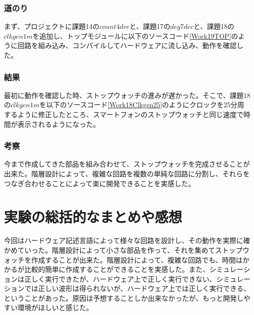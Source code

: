 \documentclass[a4paper]{jarticle}
\begin{document}
\subsubsection{道のり}
まず、プロジェクトに課題14の$count4dre$と、課題17の$deg7dec$と、課題18の$clkgen1m$を追加し、トップモジュールに以下のソースコード\ref{Work19TOP}のように回路を組み込み、コンパイルしてハードウェアに流し込み、動作を確認した。

\subsubsection{結果}
最初に動作を確認した時、ストップウォッチの進みが遅かった。そこで、課題18の$clkgen1m$を以下のソースコード\ref{Work18Clkgen25}のようにクロックを25分周するように修正したところ、スマートフォンのストップウォッチと同じ速度で時間が表示されるようになった。

\subsubsection{考察}
今まで作成してきた部品を組み合わせて、ストップウォッチを完成させることが出来た。階層設計によって、複雑な回路を複数の単純な回路に分割し、それらをつなぎ合わせることによって楽に開発できることを実感した。

\section{実験の総括的なまとめや感想}
今回はハードウェア記述言語によって様々な回路を設計し、その動作を実際に確かめていった。階層設計によって小さな部品を作って、それを集めてストップウォッチを作成することが出来た。階層設計によって、複雑な回路でも、時間はかかるが比較的簡単に作成することができることを実感した。また、シミュレーションは正しく実行できたが、ハードウェア上で正しく実行できない、シミュレーションでは正しい波形は得られないが、ハードウェア上では正しく実行できる、ということがあった。原因は予想することしか出来なかったが、もっと開発しやすい環境がほしいと感じた。
\end{document}
